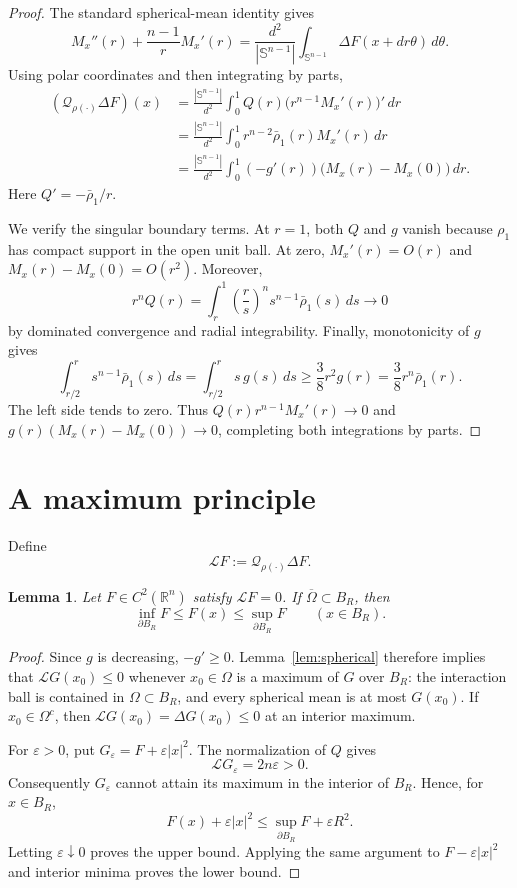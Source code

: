 \documentclass[11pt]{article}
\newtheorem{lemma}{Lemma}
\newcommand{\Qhet}{\mathcal Q_{\rho(\cdot)}}
\newcommand{\sphere}{\mathbb S^{n-1}}
\begin{document}
\begin{proof}
The standard spherical-mean identity gives
\[
 M_x''(r)+\frac{n-1}{r}M_x'(r)
 =\frac{d^2}{|\sphere|}
 \int_{\sphere}\Delta F(x+dr\theta)\,d\theta.
\]
Using polar coordinates and then integrating by parts,
\begin{align*}
 (\Qhet\Delta F)(x)
 &=\frac{|\sphere|}{d^2}
   \int_0^1Q(r)\bigl(r^{n-1}M_x'(r)\bigr)'\,dr\\
 &=\frac{|\sphere|}{d^2}
   \int_0^1r^{n-2}\bar\rho_1(r)M_x'(r)\,dr\\
 &=\frac{|\sphere|}{d^2}
   \int_0^1(-g'(r))\bigl(M_x(r)-M_x(0)\bigr)\,dr.
\end{align*}
Here \(Q'=-\bar\rho_1/r\).

We verify the singular boundary terms. At \(r=1\), both \(Q\) and \(g\)
vanish because \(\rho_1\) has compact support in the open unit ball. At zero,
\(M_x'(r)=O(r)\) and \(M_x(r)-M_x(0)=O(r^2)\). Moreover,
\[
 r^nQ(r)
 =\int_r^1\left(\frac rs\right)^n
     s^{n-1}\bar\rho_1(s)\,ds\longrightarrow0
\]
by dominated convergence and radial integrability. Finally, monotonicity of
\(g\) gives
\[
 \int_{r/2}^{r}s^{n-1}\bar\rho_1(s)\,ds
 =\int_{r/2}^{r}s\,g(s)\,ds
 \geq\frac38r^2g(r)
 =\frac38r^n\bar\rho_1(r).
\]
The left side tends to zero. Thus
\(Q(r)r^{n-1}M_x'(r)\to0\) and
\(g(r)(M_x(r)-M_x(0))\to0\), completing both integrations by parts.
\end{proof}

\section*{A maximum principle}

Define
\[
 \mathcal L F:=\Qhet\Delta F.
\]

\begin{lemma}\label{lem:max}
Let \(F\in C^2(\mathbb R^n)\) satisfy \(\mathcal LF=0\). If
\(\overline\Omega\subset B_R\), then
\[
 \inf_{\partial B_R}F\leq F(x)\leq\sup_{\partial B_R}F
 \qquad(x\in B_R).
\]
\end{lemma}

\begin{proof}
Since \(g\) is decreasing, \(-g'\geq0\). Lemma~\ref{lem:spherical} therefore
implies that \(\mathcal LG(x_0)\leq0\) whenever \(x_0\in\Omega\) is a maximum
of \(G\) over \(B_R\): the interaction ball is contained in
\(\Omega\subset B_R\), and every spherical mean is at most \(G(x_0)\).
If \(x_0\in\Omega^c\), then \(\mathcal LG(x_0)=\Delta G(x_0)\leq0\) at an
interior maximum.

For \(\varepsilon>0\), put \(G_\varepsilon=F+\varepsilon|x|^2\). The
normalization of \(Q\) gives
\[
 \mathcal L G_\varepsilon=2n\varepsilon>0.
\]
Consequently \(G_\varepsilon\) cannot attain its maximum in the interior of
\(B_R\). Hence, for \(x\in B_R\),
\[
 F(x)+\varepsilon|x|^2
 \leq\sup_{\partial B_R}F+\varepsilon R^2.
\]
Letting \(\varepsilon\downarrow0\) proves the upper bound. Applying the same
argument to \(F-\varepsilon|x|^2\) and interior minima proves the lower bound.
\end{proof}
\end{document}
